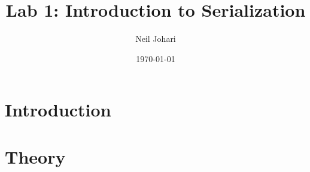 \documentclass[12pt, letterpaper]{article}
\title{Lab 1: Introduction to Serialization}
\author{Neil Johari}
\date{\today}
\begin{document}
\maketitle

\section{Introduction}


\section{Theory}
\end{document}
